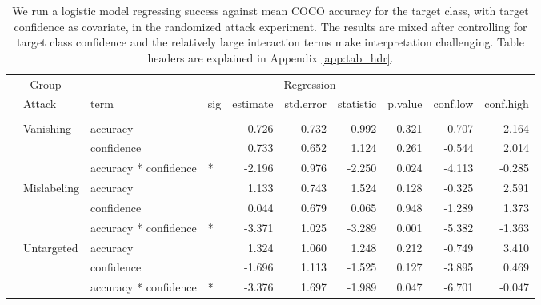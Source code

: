 \documentclass[
]{article}
\begin{document}
\begin{longtable}[t]{llllrrrrrr}
\caption{\label{tab:target_success_table}We run a logistic model regressing success against mean COCO accuracy for the target class, with target confidence as covariate, in the randomized attack experiment. The results are mixed after controlling for target class confidence and the relatively large interaction terms make interpretation challenging. Table headers are explained in Appendix \ref{app:tab_hdr}.}\\
\toprule
\multicolumn{2}{c}{Group} & \multicolumn{8}{c}{Regression} \\
\cmidrule(l{3pt}r{3pt}){1-2} \cmidrule(l{3pt}r{3pt}){3-10}
 & Attack & term & sig & estimate & std.error & statistic & p.value & conf.low & conf.high\\
\midrule
\addlinespace[0.3em]
\multicolumn{10}{l}{\textbf{YOLOv3}}\\
\hspace{1em} & Vanishing & accuracy &  & 0.726 & 0.732 & 0.992 & 0.321 & -0.707 & 2.164\\
\cmidrule{3-10}\nopagebreak
\hspace{1em} &  & confidence &  & 0.733 & 0.652 & 1.124 & 0.261 & -0.544 & 2.014\\
\cmidrule{3-10}\nopagebreak
\hspace{1em} &  & accuracy * confidence & * & -2.196 & 0.976 & -2.250 & 0.024 & -4.113 & -0.285\\
\cmidrule{2-10}\nopagebreak
\hspace{1em} & Mislabeling & accuracy &  & 1.133 & 0.743 & 1.524 & 0.128 & -0.325 & 2.591\\
\cmidrule{3-10}\nopagebreak
\hspace{1em} &  & confidence &  & 0.044 & 0.679 & 0.065 & 0.948 & -1.289 & 1.373\\
\cmidrule{3-10}\nopagebreak
\hspace{1em} &  & accuracy * confidence & * & -3.371 & 1.025 & -3.289 & 0.001 & -5.382 & -1.363\\
\cmidrule{2-10}\nopagebreak
\hspace{1em} & Untargeted & accuracy &  & 1.324 & 1.060 & 1.248 & 0.212 & -0.749 & 3.410\\
\cmidrule{3-10}\nopagebreak
\hspace{1em} &  & confidence &  & -1.696 & 1.113 & -1.525 & 0.127 & -3.895 & 0.469\\
\cmidrule{3-10}\nopagebreak
\hspace{1em} &  & accuracy * confidence & * & -3.376 & 1.697 & -1.989 & 0.047 & -6.701 & -0.047\\

\end{longtable}
\end{document}
